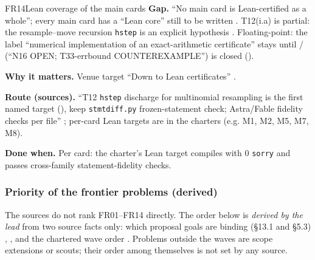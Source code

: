 \begin{card}{FR14}{Lean coverage of the main cards}
\textbf{Gap.} ``No main card is Lean-certified as a whole''; every main card has a ``Lean core'' still to be written . T12(i.a) is partial: the resample--move recursion \texttt{hstep} is an explicit hypothesis . Floating-point: the label ``numerical implementation of an exact-arithmetic certificate'' stays until  /  (``N16 OPEN; T33-errbound COUNTEREXAMPLE'') is closed ().

\textbf{Why it matters.} Venue target ``Down to Lean certificates'' .

\textbf{Route (sources).} ``T12 \texttt{hstep} discharge for multinomial resampling is the first named target (), keep \texttt{stmtdiff.py} frozen-statement check; Astra/Fable fidelity checks per file'' ; per-card Lean targets are in the charters (e.g. M1, M2, M5, M7, M8).

\textbf{Done when.} Per card: the charter's Lean target compiles with 0 \texttt{sorry} and passes cross-family statement-fidelity checks.
\end{card}

\subsubsection*{Priority of the frontier problems (derived)}\label{sec:open:frontier-rank}
The sources do not rank FR01--FR14 directly. The order below is \emph{derived by the lead} from two source facts only: which proposal goals are binding (§13.1 and §5.3) , , and the chartered wave order . Problems outside the waves are scope extensions or scouts; their order among themselves is not set by any source.

